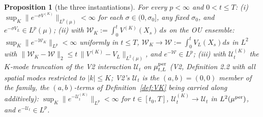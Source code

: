\documentclass[11pt,a4paper]{article}
\theoremstyle{plain}
\newtheorem{proposition}[theorem]{Proposition}
\theoremstyle{definition}
\newcommand{\U}{\mathcal U}
\newcommand{\muv}{\mu}
\begin{document}
\begin{proposition}[the three instantiations]\label{prop:nelson3}
For every $p<\infty$ and $0<t\le T$:
\emph{(i)} $\sup_{K}\|e^{-\sigma V^{(K)}}\|_{L^p(\muv)}<\infty$ for each
$\sigma\in(0,\sigma_0]$, any fixed $\sigma_0$, and $e^{-\sigma
V_L}\in L^p(\muv)$;
\emph{(ii)} with $\mathcal W_K:=\int_0^tV^{(K)}(X_s)\,ds$ on the OU
ensemble: $\sup_K\|e^{-\mathcal W_K}\|_{L^p}<\infty$ uniformly in $t\le
T$, $\mathcal W_K\to\mathcal W:=\int_0^tV_L(X_s)ds$ in $L^2$ with
$\|\mathcal W_K-\mathcal W\|_2\le t\,\|V^{(K)}-V_L\|_{L^2(\muv)}$, and
$e^{-\mathcal W}\in L^p$;
\emph{(iii)} with $\U^{(K)}_t$ the $K$-mode truncation of the V2
interaction $\U_t$ on $\mu^{\rm per}_{t,L}$ (V2, Definition 2.2 with all
spatial modes restricted to $|k|\le K$; V2's $\U_t$ is the $(a,b)=(0,0)$
member of the family, the $(a,b)$-terms of Definition~\ref{def:VK} being
carried along additively): $\sup_K\|e^{-\U^{(K)}_t}\|_{L^p}<\infty$ for $t\in[t_0,T]$,
$\U^{(K)}_t\to\U_t$ in $L^2(\mu^{\rm per})$, and $e^{-\U_t}\in L^p$.
\end{proposition}
\end{document}
